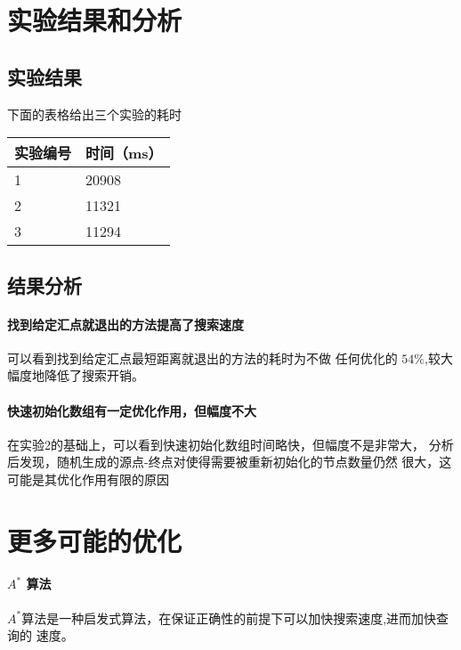 \documentclass[12pt,a4paper]{ctexart}
\begin{document}
\section{实验结果和分析}

\subsection{实验结果}

下面的表格给出三个实验的耗时
\begin{table}[htbp]
    \centering
    \begin{tabular}{|l|l|}
        \hline
        实验编号 & 时间（ms） \\ \hline
        1        & 20908      \\ \hline
        2        & 11321      \\ \hline
        3        & 11294      \\ \hline
    \end{tabular}
\end{table}

\subsection{结果分析}

\paragraph{找到给定汇点就退出的方法提高了搜索速度}
可以看到找到给定汇点最短距离就退出的方法的耗时为不做
任何优化的 $54\%$,较大幅度地降低了搜索开销。

\paragraph{快速初始化数组有一定优化作用，但幅度不大}
在实验2的基础上，可以看到快速初始化数组时间略快，但幅度不是非常大，
分析后发现，随机生成的源点-终点对使得需要被重新初始化的节点数量仍然
很大，这可能是其优化作用有限的原因



\section{更多可能的优化}
\paragraph{$A^*$ 算法}
$A^*$算法是一种启发式算法，在保证正确性的前提下可以加快搜索速度,进而加快查询的
速度。
\end{document}
